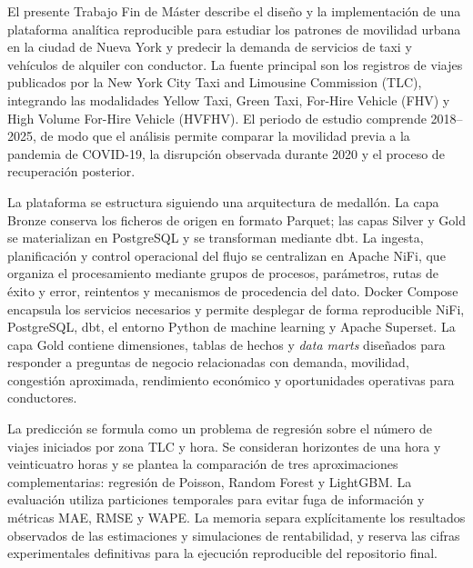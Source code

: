 El presente Trabajo Fin de Máster describe el diseño y la implementación de una plataforma analítica reproducible para estudiar los patrones de movilidad urbana en la ciudad de Nueva York y predecir la demanda de servicios de taxi y vehículos de alquiler con conductor. La fuente principal son los registros de viajes publicados por la New York City Taxi and Limousine Commission (TLC), integrando las modalidades Yellow Taxi, Green Taxi, For-Hire Vehicle (FHV) y High Volume For-Hire Vehicle (HVFHV). El periodo de estudio comprende 2018--2025, de modo que el análisis permite comparar la movilidad previa a la pandemia de COVID-19, la disrupción observada durante 2020 y el proceso de recuperación posterior.

La plataforma se estructura siguiendo una arquitectura de medallón. La capa Bronze conserva los ficheros de origen en formato Parquet; las capas Silver y Gold se materializan en PostgreSQL y se transforman mediante dbt. La ingesta, planificación y control operacional del flujo se centralizan en Apache NiFi, que organiza el procesamiento mediante grupos de procesos, parámetros, rutas de éxito y error, reintentos y mecanismos de procedencia del dato. Docker Compose encapsula los servicios necesarios y permite desplegar de forma reproducible NiFi, PostgreSQL, dbt, el entorno Python de machine learning y Apache Superset. La capa Gold contiene dimensiones, tablas de hechos y \textit{data marts} diseñados para responder a preguntas de negocio relacionadas con demanda, movilidad, congestión aproximada, rendimiento económico y oportunidades operativas para conductores.

La predicción se formula como un problema de regresión sobre el número de viajes iniciados por zona TLC y hora. Se consideran horizontes de una hora y veinticuatro horas y se plantea la comparación de tres aproximaciones complementarias: regresión de Poisson, Random Forest y LightGBM\@. La evaluación utiliza particiones temporales para evitar fuga de información y métricas MAE, RMSE y WAPE\@. La memoria separa explícitamente los resultados observados de las estimaciones y simulaciones de rentabilidad, y reserva las cifras experimentales definitivas para la ejecución reproducible del repositorio final.
